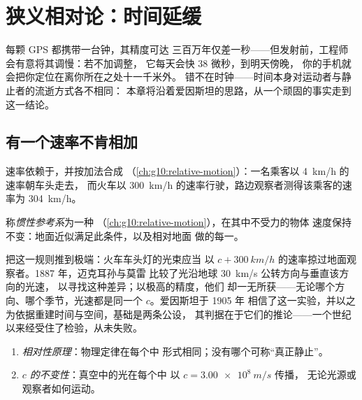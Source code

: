 \chapter{狭义相对论：时间延缓}\label{ch:g12:special-relativity}

每颗 GPS 都携带一台钟，其精度可达
三百万年仅差一秒——但发射前，工程师会有意将其调慢：若不加调整，
它每天会快 38 微秒，到明天傍晚，
你的手机就会把你定位在离你所在之处十一千米外。
错不在时钟——时间本身对运动者与静止者的流逝方式各不相同：
本章将沿着爱因斯坦的思路，从一个顽固的事实走到这一结论。

\section{有一个速率不肯相加}

速率依赖于，并按加法合成
（\cref{ch:g10:relative-motion}）：一名乘客以 \qty{4}{km/h} 的速率朝车头走去，
而火车以 \qty{300}{km/h} 的速率行驶，路边观察者测得该乘客的速率为 \qty{304}{km/h}。

\begin{definition}[惯性参考系]\label{def:g12:special-relativity:inertial}
称\emph{惯性参考系}为一种
（\cref{ch:g10:relative-motion}），在其中不受力的物体
速度保持不变：地面近似满足此条件，以及相对地面
做的每一。
\end{definition}

把这一规则推到极端：火车车头灯的光束应当
以 $c + \qty{300}{km/h}$ 的速率掠过地面观察者。1887 年，迈克耳孙与莫雷
比较了光沿地球 \qty{30}{km/s} 公转方向与垂直该方向的光速，
以寻找这种差异；以极高的精度，他们
却一无所获——无论哪个方向、哪个季节，光速都是同一个 $c$。爱因斯坦于 1905 年
相信了这一实验，并以之为依据重建时间与空间，基础是两条公设，
其判据在于它们的推论——一个世纪以来经受住了检验，从未失败。

\begin{theorem}[狭义相对论的两条公设]\label{thm:g12:special-relativity:postulates}
\begin{enumerate}
  \item \emph{相对性原理}：物理定律在每个中
        形式相同；没有哪个可称“真正静止”。
  \item \emph{$c$ 的不变性}：真空中的光在每个中
        以 $c = \qty{3.00e8}{m/s}$ 传播，
        无论光源或观察者如何运动。
\end{enumerate}
\end{theorem}
\admitted

